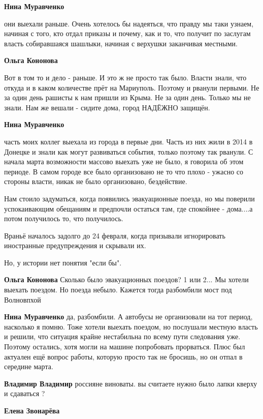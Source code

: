 \begin{itemize}
\textbf{Нина Муравченко} 

они выехали раньше. Очень хотелось бы надеяться, что правду мы таки узнаем,
начиная с того, кто отдал приказы и почему, как и то, что получит по заслугам
власть собиравшаяся шашлыки, начиная с верхушки заканчивая местными.

\textbf{Ольга Кононова}

\obeycr
Вот в том то и дело - раньше.
И это ж не просто так было.
Власти знали, что откуда и в каком количестве прёт на Мариуполь.
Поэтому и рванули первыми.
Не за один день рашисты к нам пришли из Крыма.
Не за один день.
Только мы не знали. Нам же вешали - сидите дома, город НАДЁЖНО защищён.
\restorecr

\textbf{Нина Муравченко} 

часть моих коллег выехала из города в первые дни. Часть из них жили в 2014 в
Донецке и знали как могут развиваться события, только поэтому так рванули. С
начала марта возможности массово выехать уже не было, я говорила об этом
периоде. В самом городе все было организовано не то что плохо - ужасно со
стороны власти, никак не было организовано, бездействие.

Нам стоило задуматься, когда появились эвакуационные поезда, но мы поверили
успокаивающим обещаниям и предпочли остаться там, где спокойнее - дома....а
потом получилось то, что получилось.

Враньё началось задолго до 24 февраля, когда призывали игнорировать иностранные
предупреждения и скрывали их.

Но, у истории нет понятия "если бы".

\textbf{Ольга Кононова} Сколько было эвакуационных поездов?
1 или 2...
Мы хотели выехать поездом. Но поезда небыло. Кажется тогда разбомбили мост под Волновпхой

\textbf{Нина Муравченко} да, разбомбили. А автобусы не организовали на тот период, насколько я помню. Тоже хотели выехать поездом, но послушали местную власть и решили, что ситуация крайне нестабильна по всему пути следования уже. Поэтому остались, хотя могли на машине попробовать прорваться. Плюс был актуален ещё вопрос работы, которую просто так не бросишь, но он отпал в середине марта.


\textbf{Владимир Владимир} россияне виноваты. вы считаете нужно было лапки кверху и сдаваться ?

\textbf{Елена Звонарёва} 


\end{itemize}
